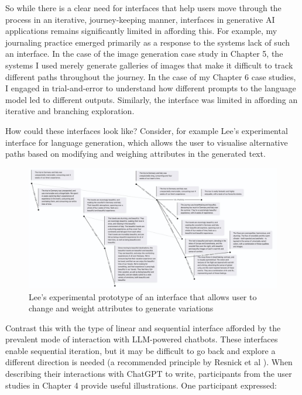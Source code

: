 So while there is a clear need for interfaces that help users move through the process in an iterative, journey-keeping manner, interfaces in generative AI applications remains significantly limited in affording this. For example, my journaling  practice emerged primarily as a response to the systems lack of such an interface. In the case of the image generation case study in Chapter 5, the systems I used merely generate galleries of images that make it difficult to track different paths throughout the journey. In the case of my Chapter 6 case studies, I engaged in trial-and-error to understand how different prompts to the language model led to different outputs. Similarly, the interface was limited in affording an iterative and branching exploration.

How could these interfaces look like? Consider, for example Lee's experimental interface for language generation, which allows the user to visualise alternative paths based on modifying and weighing attributes in the generated text. 

\begin{figure}[H]
    \centering
    \includegraphics[width=1\linewidth]{linuslee.png}
    \caption{Lee's experimental prototype of an interface that allows user to change and weight attributes to generate variations}
    \label{fig:linusleebranching}
\end{figure}


Contrast this with the type of linear and sequential interface afforded by the prevalent mode of interaction with LLM-powered chatbots. These interfaces enable sequential iteration, but it may be difficult to go back and explore a different direction is needed (a recommended principle by Resnick et al \cite{Resnick2005-fs}).  When describing their interactions with ChatGPT to write, participants from the user studies in Chapter 4 provide useful illustrations. One participant expressed:

